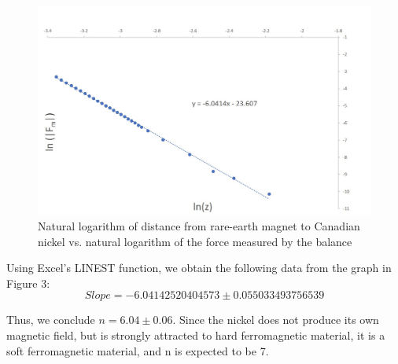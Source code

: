 \documentclass[letterpaper]{article}
\begin{document}
\begin{figure}[H]
 \centering
 \includegraphics[width=\textwidth]{nickel.jpg}
 \caption{Natural logarithm of distance from rare-earth magnet to Canadian nickel vs. natural logarithm of the force measured by the balance }
\end{figure}
\noindent Using Excel's LINEST function, we obtain the following data from the graph in Figure 3:
$$Slope =-6.04142520404573 \pm 0.055033493756539 $$

Thus, we conclude $n=6.04\pm0.06$. Since the nickel does not produce its own magnetic field, but is strongly attracted to hard ferromagnetic material, it is a soft ferromagnetic material, and n is expected to be 7.
\end{document}

